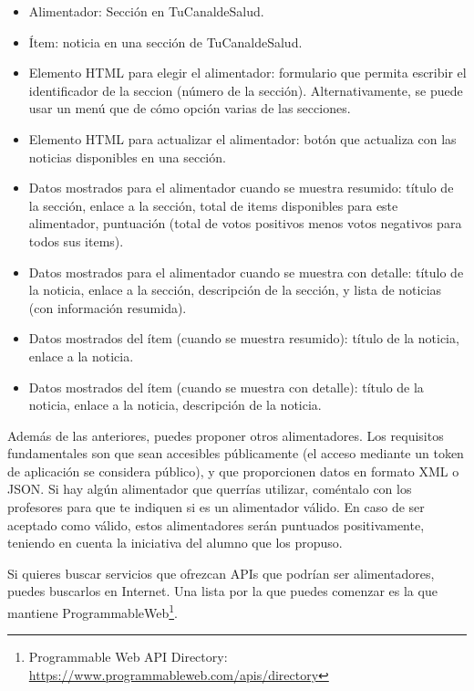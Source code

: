 \begin{itemize}
  \begin{itemize}
  \item Alimentador: Sección en TuCanaldeSalud.
  \item Ítem: noticia en una sección de TuCanaldeSalud.
  \item Elemento HTML para elegir el alimentador: formulario que permita escribir el identificador de la seccion (número de la sección). Alternativamente, se puede usar un menú que de cómo opción varias de las secciones.
  \item Elemento HTML para actualizar el alimentador: botón que actualiza con las noticias disponibles en una sección.
  \item Datos mostrados para el alimentador cuando se muestra resumido: título de la sección, enlace a la sección, total de items disponibles para este alimentador, puntuación (total de votos positivos menos votos negativos para todos sus items).
  \item Datos mostrados para el alimentador cuando se muestra con detalle: título de la noticia, enlace a la sección, descripción de la sección, y lista de noticias (con información resumida).
  \item Datos mostrados del ítem (cuando se muestra resumido): título de la noticia, enlace a la noticia.
  \item Datos mostrados del ítem (cuando se muestra con detalle): título de la noticia, enlace a la noticia, descripción de la noticia.
  \end{itemize} 
\end{itemize}

Además de las anteriores, puedes proponer otros alimentadores. Los requisitos fundamentales son que sean accesibles públicamente (el acceso mediante un token de aplicación se considera público), y que proporcionen datos en formato XML o JSON. Si hay algún alimentador que querrías utilizar, coméntalo con los profesores para que te indiquen si es un alimentador válido. En caso de ser aceptado como válido, estos alimentadores serán puntuados positivamente, teniendo en cuenta la iniciativa del alumno que los propuso.

Si quieres buscar servicios que ofrezcan APIs que podrían ser alimentadores, puedes buscarlos en Internet. Una lista por la que puedes comenzar es la que mantiene ProgrammableWeb\footnote{Programmable Web API Directory: \\\url{https://www.programmableweb.com/apis/directory}}.

